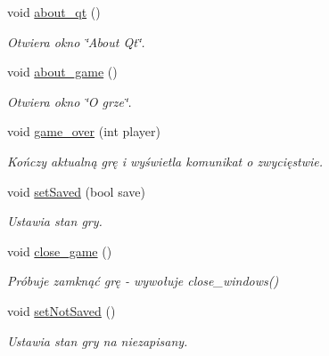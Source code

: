 \begin{DoxyCompactItemize}
\mbox{\label{classchess_game_a00156441ff76452fd40b572683ea99b9}} 
void \hyperlink{classchess_game_a00156441ff76452fd40b572683ea99b9}{about\+\_\+qt} ()
\begin{DoxyCompactList}\small\item\em Otwiera okno \char`\"{}\+About Qt\char`\"{}. \end{DoxyCompactList}\item 
\mbox{\label{classchess_game_a86245fb64348f772be40001d4f063f03}} 
void \hyperlink{classchess_game_a86245fb64348f772be40001d4f063f03}{about\+\_\+game} ()
\begin{DoxyCompactList}\small\item\em Otwiera okno \char`\"{}\+O grze\char`\"{}. \end{DoxyCompactList}\item 
\mbox{\label{classchess_game_a209b5541bf8d34b7f9ff0c48972bf972}} 
void \hyperlink{classchess_game_a209b5541bf8d34b7f9ff0c48972bf972}{game\+\_\+over} (int player)
\begin{DoxyCompactList}\small\item\em Kończy aktualną grę i wyświetla komunikat o zwycięstwie. \end{DoxyCompactList}\item 
\mbox{\label{classchess_game_af9fbb7c1bd1157a851633e026d6d677b}} 
void \hyperlink{classchess_game_af9fbb7c1bd1157a851633e026d6d677b}{set\+Saved} (bool save)
\begin{DoxyCompactList}\small\item\em Ustawia stan gry. \end{DoxyCompactList}\item 
\mbox{\label{classchess_game_a2976c11fff9100843c0842504c039c4f}} 
void \hyperlink{classchess_game_a2976c11fff9100843c0842504c039c4f}{close\+\_\+game} ()
\begin{DoxyCompactList}\small\item\em Próbuje zamknąć grę -\/ wywołuje close\+\_\+windows() \end{DoxyCompactList}\item 
\mbox{\label{classchess_game_aa53efb2e6476d9a7445e7a166ebe023b}} 
void \hyperlink{classchess_game_aa53efb2e6476d9a7445e7a166ebe023b}{set\+Not\+Saved} ()
\begin{DoxyCompactList}\small\item\em Ustawia stan gry na niezapisany. \end{DoxyCompactList}\end{DoxyCompactItemize}
